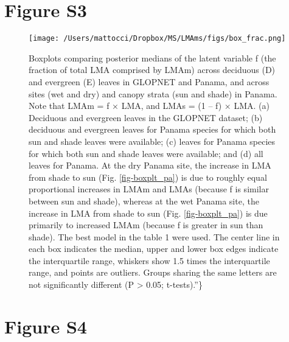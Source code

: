 \documentclass[
  12pt,
  letterpaper,
  DIV=11,
  numbers=noendperiod]{scrartcl}
\begin{document}
\newpage

\hypertarget{figure-s3}{%
\section{Figure S3}\label{figure-s3}}

\begin{figure}

{\centering \texttt{[image: /Users/mattocci/Dropbox/MS/LMAms/figs/box\_frac.png]}

}

\caption{\label{fig-box_frac}Boxplots comparing posterior medians of the
latent variable f (the fraction of total LMA comprised by LMAm) across
deciduous (D) and evergreen (E) leaves in GLOPNET and Panama, and across
sites (wet and dry) and canopy strata (sun and shade) in Panama. Note
that LMAm = f × LMA, and LMAs = (1 -- f) × LMA. (a) Deciduous and
evergreen leaves in the GLOPNET dataset; (b) deciduous and evergreen
leaves for Panama species for which both sun and shade leaves were
available; (c) leaves for Panama species for which both sun and shade
leaves were available; and (d) all leaves for Panama. At the dry Panama
site, the increase in LMA from shade to sun (Fig. \ref{fig-boxplt_pa})
is due to roughly equal proportional increases in LMAm and LMAs (because
f is similar between sun and shade), whereas at the wet Panama site, the
increase in LMA from shade to sun (Fig. \ref{fig-boxplt_pa}) is due
primarily to increased LMAm (because f is greater in sun than shade).
The best model in the table 1 were used. The center line in each box
indicates the median, upper and lower box edges indicate the
interquartile range, whiskers show 1.5 times the interquartile range,
and points are outliers. Groups sharing the same letters are not
significantly different (P \textgreater{} 0.05; t-tests).''\}}

\end{figure}

\newpage

\hypertarget{figure-s4}{%
\section{Figure S4}\label{figure-s4}}
\end{document}
